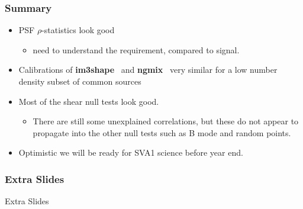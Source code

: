 \documentclass{beamer}
\newcommand{\ngmix}{ {\bf ngmix} }
\newcommand{\imshape}{ {\bf im3shape} }
\begin{document}
\frame
{
    \frametitle{Summary}

    \begin{itemize}

        \item PSF $\rho$-statistics look good
            \begin{itemize}
                \item need to understand the requirement, compared to signal.
            \end{itemize}

        \item Calibrations of \imshape\ and \ngmix\ very similar for a low number
            density subset of common sources

        \item Most of the shear null tests look good.

            \begin{itemize}

                \item There are still some unexplained correlations, but these
                    do not appear to propagate into the other null tests such
                    as B mode and random points.

            \end{itemize}
            
        \item Optimistic we will be ready for SVA1 science before year end.

    \end{itemize}
}


\frame
{
    \frametitle{Extra Slides}
    {\Huge Extra Slides}
}
\end{document}

